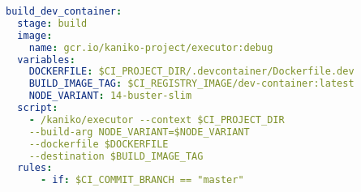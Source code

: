 
\begin{lstlisting}[language=yml,caption={GitLab \ac{CI} build file for Docker Images},breaklines=true,label={code::ci_build_yml}]
build_dev_container:
  stage: build
  image:
    name: gcr.io/kaniko-project/executor:debug
  variables:
    DOCKERFILE: $CI_PROJECT_DIR/.devcontainer/Dockerfile.dev
    BUILD_IMAGE_TAG: $CI_REGISTRY_IMAGE/dev-container:latest
    NODE_VARIANT: 14-buster-slim
  script:
    - /kaniko/executor --context $CI_PROJECT_DIR
    --build-arg NODE_VARIANT=$NODE_VARIANT
    --dockerfile $DOCKERFILE
    --destination $BUILD_IMAGE_TAG
  rules:
      - if: $CI_COMMIT_BRANCH == "master"

\end{lstlisting}
